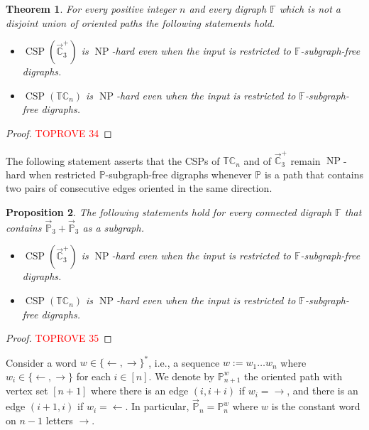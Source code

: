 \documentclass{article}
\newtheorem{theorem}{Theorem}
\newtheorem{proposition}[theorem]{Proposition}
\theoremstyle{definition}
\theoremstyle{remark}
\DeclareMathOperator{\NP}{NP}
\DeclareMathOperator{\CSP}{CSP}
\newcommand{\bC}{{\mathbb C}}
\newcommand{\bF}{{\mathbb F}}
\newcommand{\bP}{{\mathbb P}}
\newcommand{\bT}{{\mathbb T}}
\begin{document}
\begin{theorem}\label{thm:non-paths}
    For every positive integer $n$ and every digraph $\bF$ which is not a disjoint union of oriented paths
    the following statements hold.
    \begin{itemize}
        \item $\CSP(\vec{\bC}_3^+)$ is $\NP$-hard even when the input is restricted to $\bF$-subgraph-free digraphs.
        \item $\CSP(\bT\bC_n)$ is $\NP$-hard even when the input is restricted to $\bF$-subgraph-free digraphs.
    \end{itemize}
\end{theorem}
\begin{proof}\textcolor{red}{TOPROVE 34}\end{proof}


The following statement asserts that the CSPs of $\bT\bC_n$ and of $\vec{\bC}_3^+$ remain
$\NP$-hard when restricted $\bP$-subgraph-free digraphs whenever $\bP$ 
is a path that contains two pairs of consecutive edges oriented in the same direction.

\begin{proposition}\label{prop:P3+P3}
    The following statements hold for every connected digraph $\bF$ that contains
    $\vec{\bP}_3+\vec{\bP}_3$ as a subgraph.
    \begin{itemize}
        \item $\CSP(\vec{\bC}_3^+)$ is $\NP$-hard even when the input is restricted to
        $\bF$-subgraph-free digraphs.
        \item$\CSP(\bT\bC_n)$ is $\NP$-hard even when the input is restricted to
        $\bF$-subgraph-free digraphs.
    \end{itemize}
\end{proposition}
\begin{proof}\textcolor{red}{TOPROVE 35}\end{proof}

Consider a word $w\in\{\leftarrow,\rightarrow\}^\ast$, i.e., a sequence
$w:=w_1\dots w_n$ where $w_i\in\{\leftarrow,\rightarrow\}$ for each $i\in[n]$. We denote
by $\bP_{n+1}^w$ the oriented path with vertex set $[n+1]$ where there is an edge $(i,i+i)$
if $w_i = \rightarrow$, and there is an edge $(i+1,i)$ if $w_i = \leftarrow$. 
In particular, $\vec{\bP}_n = \bP_n^w$ where $w$ is the constant word on $n-1$ letters
$\rightarrow$.
\end{document}
